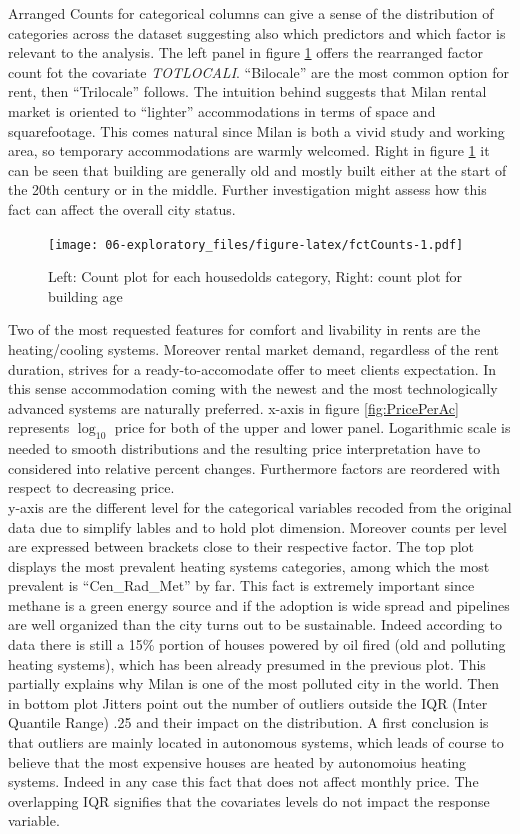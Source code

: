 \documentclass[
  12pt,
  a4paper,
  oneside]{book}
\theoremstyle{definition}
\theoremstyle{definition}
\theoremstyle{definition}
\theoremstyle{remark}
\begin{document}
Arranged Counts for categorical columns can give a sense of the distribution of categories across the dataset suggesting also which predictors and which factor is relevant to the analysis. The left panel in figure \ref{fig:fctCounts} offers the rearranged factor count fot the covariate \emph{TOTLOCALI}. ``Bilocale'' are the most common option for rent, then ``Trilocale'' follows. The intuition behind suggests that Milan rental market is oriented to ``lighter'' accommodations in terms of space and squarefootage. This comes natural since Milan is both a vivid study and working area, so temporary accommodations are warmly welcomed. Right in figure \ref{fig:fctCounts} it can be seen that building are generally old and mostly built either at the start of the 20th century or in the middle. Further investigation might assess how this fact can affect the overall city status.

\begin{figure}
\centering
\texttt{[image: 06-exploratory\_files/figure-latex/fctCounts-1.pdf]}
\caption{\label{fig:fctCounts}Left: Count plot for each housedolds category, Right: count plot for building age}
\end{figure}

Two of the most requested features for comfort and livability in rents are the heating/cooling systems. Moreover rental market demand, regardless of the rent duration, strives for a ready-to-accomodate offer to meet clients expectation. In this sense accommodation coming with the newest and the most technologically advanced systems are naturally preferred.
x-axis in figure \ref{fig:PricePerAc} represents \(\log_{10}\) price for both of the upper and lower panel. Logarithmic scale is needed to smooth distributions and the resulting price interpretation have to considered into relative percent changes. Furthermore factors are reordered with respect to decreasing price.\\
y-axis are the different level for the categorical variables recoded from the original data due to simplify lables and to hold plot dimension. Moreover counts per level are expressed between brackets close to their respective factor.
The top plot displays the most prevalent heating systems categories, among which the most prevalent is ``Cen\_Rad\_Met'' by far. This fact is extremely important since methane is a green energy source and if the adoption is wide spread and pipelines are well organized than the city turns out to be sustainable. Indeed according to data there is still a 15\% portion of houses powered by oil fired (old and polluting heating systems), which has been already presumed in the previous plot. This partially explains why Milan is one of the most polluted city in the world.
Then in bottom plot Jitters point out the number of outliers outside the IQR (Inter Quantile Range) .25 and their impact on the distribution. A first conclusion is that outliers are mainly located in autonomous systems, which leads of course to believe that the most expensive houses are heated by autonomoius heating systems. Indeed in any case this fact that does not affect monthly price. The overlapping IQR signifies that the covariates levels do not impact the response variable.
\end{document}
